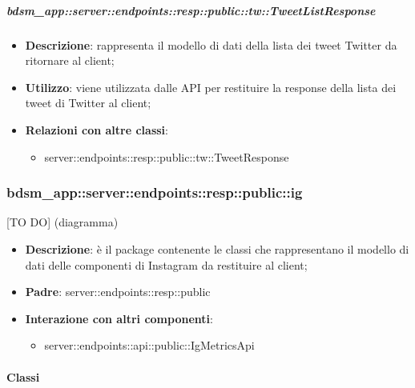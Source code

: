     \subparagraph{bdsm\_app::server::endpoints::resp::public::tw::TweetListResponse} %
    \label{subp:bdsm_app_server_endpoints_resp_public_tw_tweetlistresponse}
    \begin{itemize}
      \item \textbf{Descrizione}: rappresenta il modello di dati della lista dei tweet Twitter da ritornare al client;
      \item \textbf{Utilizzo}: viene utilizzata dalle API per restituire la response della lista dei tweet di Twitter al client;
      \item \textbf{Relazioni con altre classi}:
        \begin{itemize}
          \item server::endpoints::resp::public::tw::TweetResponse
        \end{itemize}
      \end{itemize}

\subsubsection{bdsm\_app::server::endpoints::resp::public::ig} %
\label{ssub:bdsm_app_server_endpoints_resp_public_ig}
[TO DO] (diagramma) \newline \newline

\begin{itemize}
  \item \textbf{Descrizione}: è il package contenente le classi che rappresentano il modello di dati delle componenti di Instagram da restituire al client;
  \item \textbf{Padre}: server::endpoints::resp::public
  \item \textbf{Interazione con altri componenti}:
  	\begin{itemize}
  		\item server::endpoints::api::public::IgMetricsApi
  	\end{itemize}
\end{itemize}

	\paragraph{Classi} %

